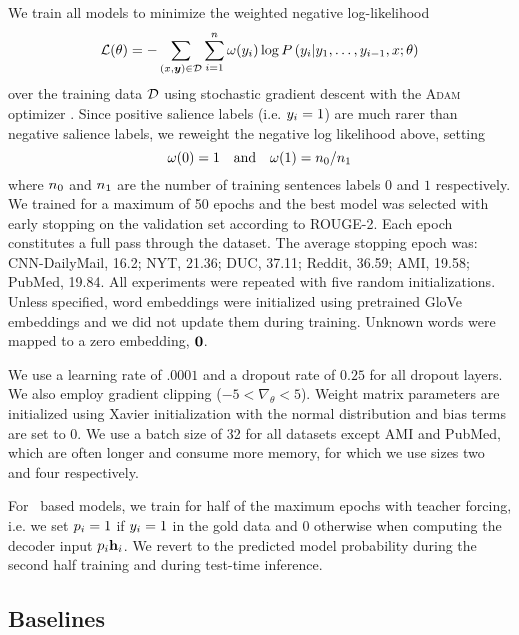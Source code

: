 We train all models to minimize the weighted negative log-likelihood
\[\mathcal{L(\theta)} = -\sum_{(x,\boldsymbol{y}) \in \mathcal{D} } \sum_{i=1}^n \omega(y_i) \log P\left(y_i|y_1,\ldots,y_{i-1},x;\theta\right) \]
over the training data $\mathcal{D}$
using stochastic gradient descent with the \textsc{Adam} optimizer
\citep{kingma2014adam}. Since positive salience labels (i.e. $y_i = 1$)
are much rarer than negative salience labels, we reweight the negative
log likelihood above, setting
\[\omega(0)=1 \quad \textrm{and}\quad \omega(1) = n_0/n_1\] where $n_0$ and $n_1$ 
are the number of training sentences labels $0$ and $1$ respectively.
    We trained for a maximum of 50 epochs and the best
    model was selected with early stopping on the validation set according
    to ROUGE-2. Each epoch constitutes a full pass through the
    dataset. The average stopping epoch was: CNN-DailyMail, 16.2; NYT, 21.36; DUC, 37.11; Reddit, 36.59; AMI, 19.58; PubMed, 19.84.
     All experiments were repeated with five random
    initializations.     Unless specified, word embeddings were initialized 
    using pretrained GloVe embeddings \citep{pennington2014glove} and we did 
    not update them during training. Unknown words were mapped to a zero 
    embedding, $\mathbf{0}$.

    We use a learning rate of $.0001$ and a dropout rate of $0.25$ for all dropout
    layers. We also employ gradient clipping ($-5 < \nabla_\theta < 5$).
    Weight matrix parameters are initialized using 
    Xavier initialization with the normal distribution 
    \citep{glorot2010understanding} and bias terms are set to $0$.
    We use a batch size of 32 for all datasets except AMI and PubMed, which
    are often longer and consume more memory, for
    which we use sizes two and four respectively.

    For \clext~based models, we train for half of the maximum epochs 
    with teacher forcing, i.e. we set $p_i = 1$
    if $y_i = 1$ in the gold data and $0$ otherwise 
    when computing the decoder input 
    $p_i \mathbf{h}_i$. We revert to the predicted model probability 
    during the second half training and during test-time inference.






\subsection{Baselines}
